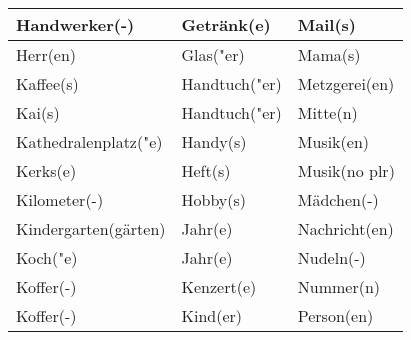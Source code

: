 \documentclass{article}
\begin{document}
\begin{table}[h!]
\begin{tabular}{|>{\raggedright\arraybackslash}p{5cm}|>{\raggedright\arraybackslash}p{5cm}|>{\raggedright\arraybackslash}p{5cm}|}
        Handwerker(-) & Getränk(e) & Mail(s) \\\hline
        Herr(en) & Glas("er) & Mama(s) \\\hline
        Kaffee(s) & Handtuch("er) & Metzgerei(en) \\\hline
        Kai(s) & Handtuch("er) & Mitte(n) \\\hline
        Kathedralenplatz("e) & Handy(s) & Musik(en) \\\hline
        Kerks(e) & Heft(s) & Musik(no plr) \\\hline
        Kilometer(-) & Hobby(s) & Mädchen(-) \\\hline
        Kindergarten(gärten) & Jahr(e) & Nachricht(en) \\\hline
        Koch("e) & Jahr(e) & Nudeln(-) \\\hline
        Koffer(-) & Kenzert(e) & Nummer(n) \\\hline
        Koffer(-) & Kind(er) & Person(en) \\\hline
    \end{tabular}
\end{table}

\newpage
\end{document}
